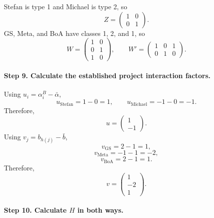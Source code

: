 \documentclass[11pt]{article}
\begin{document}
Stefan is type 1 and Michael is type 2, so
\[
Z
=
\begin{pmatrix}
1&0\\
0&1
\end{pmatrix}.
\tag{73}
\]
GS, Meta, and BoA have classes 1, 2, and 1, so
\[
W
=
\begin{pmatrix}
1&0\\
0&1\\
1&0
\end{pmatrix},
\qquad
W'
=
\begin{pmatrix}
1&0&1\\
0&1&0
\end{pmatrix}.
\tag{74}
\]

\paragraph{Step 9. Calculate the established project interaction factors.}

Using \(u_i=\alpha_i^B-\bar\alpha\),
\[
u_{\text{Stefan}}=1-0=1,
\qquad
u_{\text{Michael}}=-1-0=-1.
\]
Therefore,
\[
u=
\begin{pmatrix}
1\\
-1
\end{pmatrix}.
\tag{75}
\]
Using \(v_j=b_{h(j)}-\bar b\),
\[
v_{\text{GS}}=2-1=1,
\]
\[
v_{\text{Meta}}=-1-1=-2,
\]
\[
v_{\text{BoA}}=2-1=1.
\]
Therefore,
\[
v=
\begin{pmatrix}
1\\
-2\\
1
\end{pmatrix}.
\tag{76}
\]

\paragraph{Step 10. Calculate \(H\) in both ways.}
\end{document}
